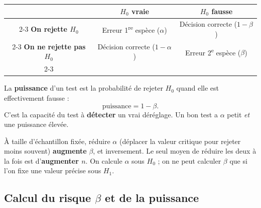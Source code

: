 \documentclass[a4paper,11pt]{article}
\begin{document}
\begin{center}
\renewcommand{\arraystretch}{1.5}
\begin{tabular}{@{}c|c|c@{}}
\multicolumn{1}{c}{} & \multicolumn{1}{c}{\textbf{$H_0$ vraie}} & \multicolumn{1}{c}{\textbf{$H_0$ fausse}} \\
\cline{2-3}
\textbf{On rejette $H_0$}       & \cellcolor{uimmred!15} Erreur 1\textsuperscript{re} espèce ($\alpha$) & \cellcolor{green!12} Décision correcte ($1-\beta$) \\
\cline{2-3}
\textbf{On ne rejette pas $H_0$} & \cellcolor{green!12} Décision correcte ($1-\alpha$) & \cellcolor{uimmred!15} Erreur 2\textsuperscript{e} espèce ($\beta$) \\
\cline{2-3}
\end{tabular}
\end{center}

\begin{definition}
La \textbf{puissance} d'un test est la probabilité de rejeter $H_0$ quand elle est effectivement fausse :
\[
\text{puissance} = 1 - \beta.
\]
C'est la capacité du test à \textbf{détecter} un vrai déréglage. Un bon test a $\alpha$ petit \emph{et} une puissance élevée.
\end{definition}

\begin{attention}
À taille d'échantillon fixée, réduire $\alpha$ (déplacer la valeur critique pour rejeter moins souvent) \textbf{augmente} $\beta$, et inversement. Le seul moyen de réduire les deux à la fois est d'\textbf{augmenter $n$}. On calcule $\alpha$ sous $H_0$ ; on ne peut calculer $\beta$ que si l'on fixe une valeur précise sous $H_1$.
\end{attention}

\subsection{Calcul du risque $\beta$ et de la puissance}
\end{document}
